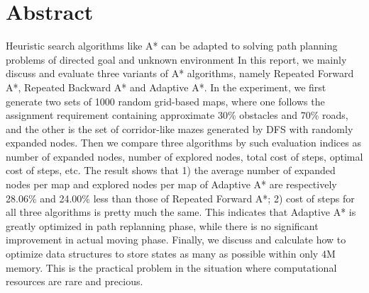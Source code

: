 \section*{Abstract}

Heuristic search algorithms like A* can be adapted to solving path planning 
problems of directed goal and unknown environment In this report, we mainly 
discuss and evaluate three variants of A* algorithms, namely Repeated Forward 
A*, Repeated Backward A* and Adaptive A*. In the experiment, we first generate 
two sets of 1000 random grid-based maps, where one follows the assignment 
requirement containing approximate 30\% obstacles and 70\% roads, and the other 
is the set of corridor-like mazes generated by DFS with randomly expanded nodes. 
Then we compare three algorithms by such evaluation indices as number of 
expanded nodes, number of explored nodes, total cost of steps, optimal cost of 
steps, etc. The result shows that 1) the average number of expanded nodes per 
map and explored nodes per map of Adaptive A* are respectively 28.06\% and 
24.00\% less than those of Repeated 
Forward A*; 2) cost of steps for all three algorithms is pretty much the same. 
This indicates that Adaptive A* is greatly optimized in path replanning phase, 
while there is no significant improvement in actual moving phase. Finally, we 
discuss and calculate how to optimize data structures to store states as many 
as possible within only 4M memory. This is the practical problem in the situation
where computational resources are rare and precious.

